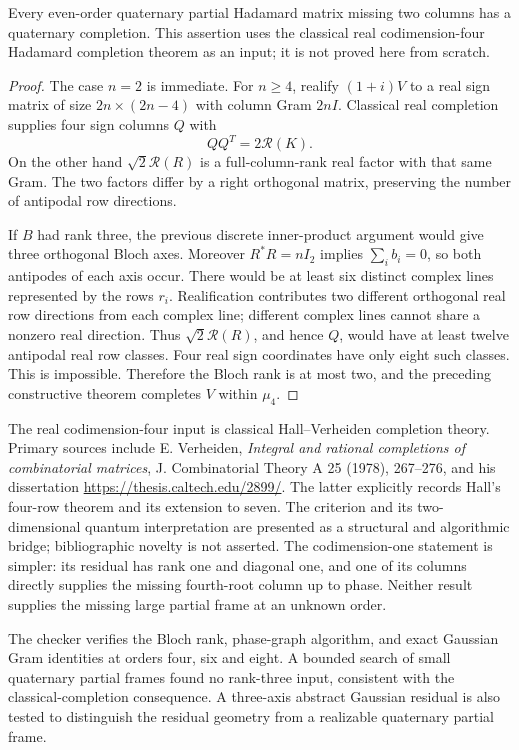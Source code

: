 \begin{theorem}
Every even-order quaternary partial Hadamard matrix missing two
columns has a quaternary completion.
This assertion uses the classical real codimension-four Hadamard
completion theorem as an input; it is not proved here from scratch.
\end{theorem}
\begin{proof}
The case $n=2$ is immediate. For $n\ge4$, realify $(1+i)V$ to a
real sign matrix of size $2n\times(2n-4)$ with column Gram $2nI$.
Classical real completion supplies four sign columns $Q$ with
\[
 QQ^T=2\mathcal R(K).
\]
On the other hand $\sqrt2\mathcal R(R)$ is a full-column-rank real
factor with that same Gram. The two factors differ by a right
orthogonal matrix, preserving the number of antipodal row directions.

If $B$ had rank three, the previous discrete inner-product argument
would give three orthogonal Bloch axes. Moreover $R^*R=nI_2$
implies $\sum_i b_i=0$, so both antipodes of each axis occur.
There would be at least six distinct complex lines represented by
the rows $r_i$. Realification contributes two different orthogonal
real row directions from each complex line; different complex lines
cannot share a nonzero real direction. Thus
$\sqrt2\mathcal R(R)$, and hence $Q$, would have at least twelve
antipodal real row classes. Four real sign coordinates have only
eight such classes. This is impossible. Therefore the Bloch rank is
at most two, and the preceding constructive theorem completes $V$
within $\mu_4$.
\end{proof}

The real codimension-four input is classical Hall--Verheiden
completion theory. Primary sources include E. Verheiden,
\emph{Integral and rational completions of combinatorial matrices},
J. Combinatorial Theory A 25 (1978), 267--276, and his dissertation
\url{https://thesis.caltech.edu/2899/}. The latter explicitly records
Hall's four-row theorem and its extension to seven. The criterion
and its two-dimensional quantum interpretation are presented as a
structural and algorithmic bridge; bibliographic novelty is not asserted.
The codimension-one statement is simpler: its residual has rank one
and diagonal one, and one of its columns directly supplies the
missing fourth-root column up to phase. Neither result supplies
the missing large partial frame at an unknown order.

The checker verifies the Bloch rank, phase-graph algorithm, and exact
Gaussian Gram identities at orders four, six and eight. A bounded
search of small quaternary partial frames found no rank-three input,
consistent with the classical-completion consequence. A three-axis
abstract Gaussian residual is also tested to distinguish the
residual geometry from a realizable quaternary partial frame.
